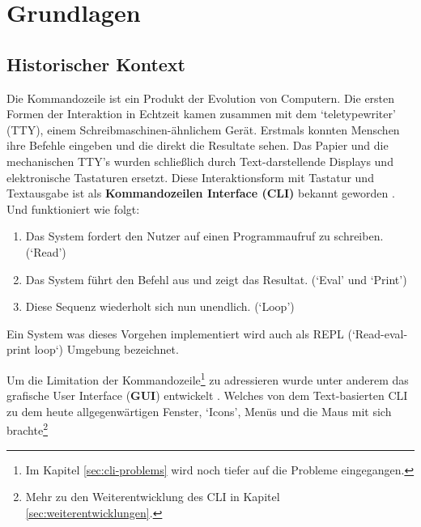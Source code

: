 \documentclass[oneside,bibliography=totocnumbered,BCOR=5mm]{scrbook}
\begin{document}
\chapter{Grundlagen}
\label{sec:grundlagen}

\section{Historischer Kontext}
\label{sec:historic-context}

Die Kommandozeile ist ein Produkt der Evolution von Computern. Die ersten Formen
der Interaktion in Echtzeit kamen zusammen mit dem `teletypewriter' (TTY),
einem Schreibmaschinen-ähnlichem Gerät. Erstmals konnten Menschen ihre Befehle
eingeben und die direkt die Resultate sehen. Das Papier und die mechanischen
TTY's wurden schließlich durch Text-darstellende Displays und elektronische
Tastaturen ersetzt. Diese Interaktionsform mit Tastatur und Textausgabe ist als
\textbf{Kommandozeilen Interface (CLI)} bekannt geworden \parencite[35f]{nagarajan2018}.
Und funktioniert wie folgt:

\begin{enumerate}
  \item Das System fordert den Nutzer auf einen Programmaufruf zu schreiben. (`Read')
  \item Das System führt den Befehl aus und zeigt das Resultat. (`Eval' und `Print')
  \item Diese Sequenz wiederholt sich nun unendlich. (`Loop')
\end{enumerate}

Ein System was dieses Vorgehen implementiert wird auch als REPL (`Read-eval-print
loop`) Umgebung bezeichnet.

\smallskip

Um die Limitation der Kommandozeile\footnote{Im Kapitel \ref{sec:cli-problems}
wird noch tiefer auf die Probleme eingegangen.} zu adressieren wurde
unter anderem das grafische User Interface (\textbf{GUI}) entwickelt
\parencite{nielson1993}. Welches von dem Text-basierten CLI zu dem
heute allgegenwärtigen Fenster, `Icons', Menüs und die Maus mit sich
brachte\footnote{Mehr zu den Weiterentwicklung des CLI in Kapitel
\ref{sec:weiterentwicklungen}.}

\end{document}
